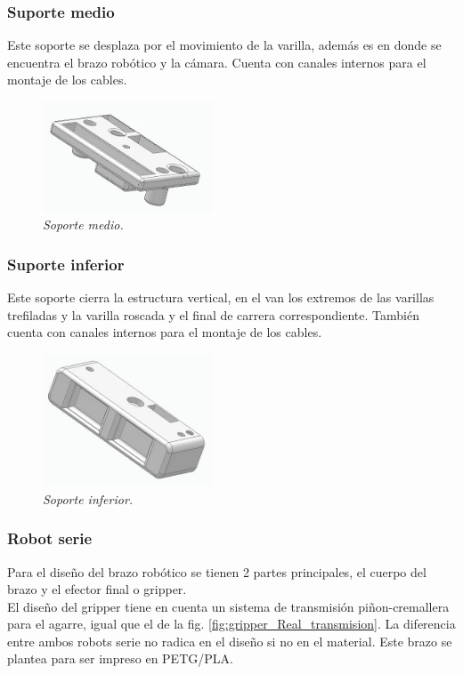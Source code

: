 \subsubsection{Suporte medio}
Este soporte se desplaza por el movimiento de la varilla, además es en donde se encuentra el brazo robótico y la cámara. Cuenta con canales internos para el montaje de los cables. \\
\begin{figure}[H]
    \centering
\includegraphics[width=0.45\textwidth]{img/medio.jpg} \par
    \caption{\textit{Soporte medio.}}
    \label{fig:soporte_medio}
\end{figure}

\subsubsection{Suporte inferior}
Este soporte cierra la estructura vertical, en el van los extremos de las varillas trefiladas y la varilla roscada y el final de carrera correspondiente. También cuenta con canales internos para el montaje de los cables. \\
\begin{figure}[H]
    \centering
\includegraphics[width=0.45\textwidth]{img/inferior_completo.jpg} \par
    \caption{\textit{Soporte inferior.}}
    \label{fig:soporte_inferior}
\end{figure}

\subsubsection{Robot serie}
Para el diseño del brazo robótico se tienen 2 partes principales, el cuerpo del brazo y el efector final o gripper. \\
El diseño del gripper tiene en cuenta un sistema de transmisión piñon-cremallera para el agarre, igual que el de la  fig. \ref{fig:gripper_Real_transmision}. La diferencia entre ambos robots serie no radica en el diseño si no en el material. Este brazo se plantea para ser impreso en PETG/PLA.\\

